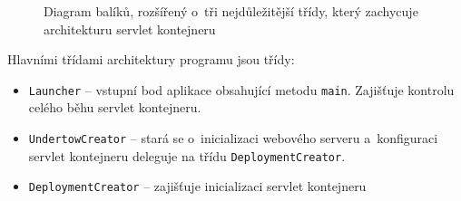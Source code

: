             \begin{figure}[h!t]
                \begin{center}
                    \caption{Diagram balíků, rozšířený o~tři nejdůležitější třídy, který zachycuje architekturu servlet kontejneru}
                    \label{imgPackage}
                \end{center}
            \end{figure}

            Hlavními třídami architektury programu jsou třídy:
            \begin{itemize}
                \item \texttt{Launcher} -- vstupní bod aplikace obsahující metodu \texttt{main}. 
                    Zajišťuje kontrolu celého běhu servlet kontejneru. 

                \item \texttt{UndertowCreator} -- stará se o~inicializaci webového serveru
                    a~konfiguraci servlet kontejneru deleguje na třídu \texttt{DeploymentCreator}.

                \item \texttt{DeploymentCreator} -- zajišťuje inicializaci servlet kontejneru 
            \end{itemize}


